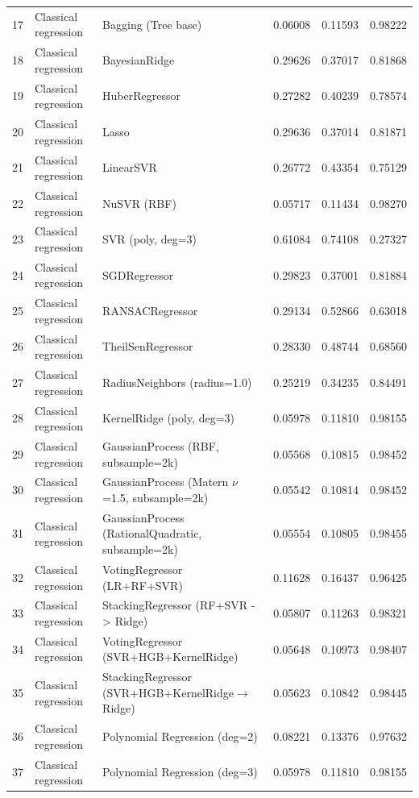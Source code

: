 \documentclass[10pt]{article}
\begin{document}
\begin{longtable}{C{0.75cm}L{2.35cm}L{8.0cm}C{1.15cm}C{1.15cm}C{1.15cm}}
17 & Classical regression & Bagging (Tree base) & 0.06008 & 0.11593 & 0.98222 \\
18 & Classical regression & BayesianRidge & 0.29626 & 0.37017 & 0.81868 \\
19 & Classical regression & HuberRegressor & 0.27282 & 0.40239 & 0.78574 \\
20 & Classical regression & Lasso & 0.29636 & 0.37014 & 0.81871 \\
21 & Classical regression & LinearSVR & 0.26772 & 0.43354 & 0.75129 \\
22 & Classical regression & NuSVR (RBF) & 0.05717 & 0.11434 & 0.98270 \\
23 & Classical regression & SVR (poly, deg=3) & 0.61084 & 0.74108 & 0.27327 \\
24 & Classical regression & SGDRegressor & 0.29823 & 0.37001 & 0.81884 \\
25 & Classical regression & RANSACRegressor & 0.29134 & 0.52866 & 0.63018 \\
26 & Classical regression & TheilSenRegressor & 0.28330 & 0.48744 & 0.68560 \\
27 & Classical regression & RadiusNeighbors (radius=1.0) & 0.25219 & 0.34235 & 0.84491 \\
28 & Classical regression & KernelRidge (poly, deg=3) & 0.05978 & 0.11810 & 0.98155 \\
29 & Classical regression & GaussianProcess (RBF, subsample=2k) & 0.05568 & 0.10815 & 0.98452 \\
30 & Classical regression & GaussianProcess (Matern $\nu$=1.5, subsample=2k) & 0.05542 & 0.10814 & 0.98452 \\
31 & Classical regression & GaussianProcess (RationalQuadratic, subsample=2k) & 0.05554 & 0.10805 & 0.98455 \\
32 & Classical regression & VotingRegressor (LR+RF+SVR) & 0.11628 & 0.16437 & 0.96425 \\
33 & Classical regression & StackingRegressor (RF+SVR -> Ridge) & 0.05807 & 0.11263 & 0.98321 \\
34 & Classical regression & VotingRegressor (SVR+HGB+KernelRidge) & 0.05648 & 0.10973 & 0.98407 \\
35 & Classical regression & StackingRegressor (SVR+HGB+KernelRidge$\rightarrow$Ridge) & 0.05623 & 0.10842 & 0.98445 \\
36 & Classical regression & Polynomial Regression (deg=2) & 0.08221 & 0.13376 & 0.97632 \\
37 & Classical regression & Polynomial Regression (deg=3) & 0.05978 & 0.11810 & 0.98155 \\

\end{longtable}
\end{document}
